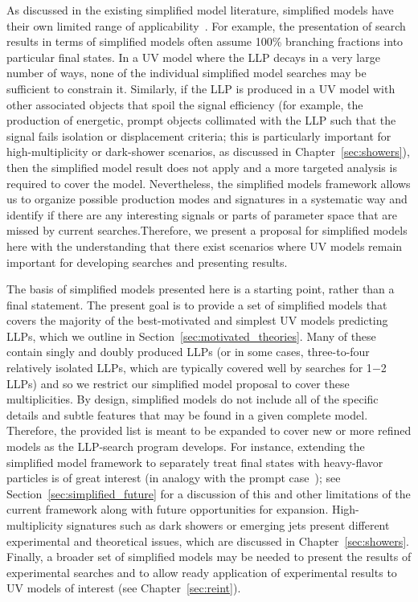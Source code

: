 As discussed in the existing simplified model literature, simplified models have their own limited range of applicability~\cite{Alves:2011wf,Abdallah:2015ter,Abercrombie:2015wmb,Boveia:2016mrp,Ambrogi:2017lov}.
For example, the presentation of search results in terms of simplified models often assume 100\% branching fractions into particular final states.
In a UV model where the LLP decays in a very large number of ways, none of the individual simplified model searches may be sufficient to constrain it.
Similarly, if the LLP is produced in a UV model with other associated objects that spoil the signal efficiency (for example, the production of energetic, prompt objects collimated with the LLP such that the signal fails isolation or displacement criteria; this is particularly important for high-multiplicity or dark-shower scenarios, as discussed in Chapter~\ref{sec:showers}), then the simplified model result does not apply and a more targeted analysis is required to cover the model.
Nevertheless, the simplified models framework allows us to organize possible production modes and signatures in a systematic way and identify if there are any interesting signals or parts of parameter space that are missed by current searches.Therefore, we present a proposal for simplified models here with the understanding that there exist scenarios where UV models remain important for developing searches and presenting results.

The basis of simplified models presented here is a starting point, rather than a final statement.
The present goal is to provide a set of simplified models that covers the majority of the best-motivated and simplest UV models predicting LLPs, which we outline in Section~\ref{sec:motivated_theories}. Many of these contain singly and doubly produced LLPs (or in some cases, three-to-four relatively isolated LLPs, which are typically covered well by searches for 1$-$2 LLPs) and so we restrict our simplified model proposal to cover these multiplicities.
By design, simplified models do not include all of the specific details and subtle features that may be found in a given complete model.
Therefore, the provided list is meant to be expanded to cover new or more refined models as the LLP-search program develops.
For instance, extending the simplified model framework to separately treat final states with heavy-flavor particles is of great interest (in analogy with the prompt case~\cite{Essig:2011qg,Brust:2011tb,Papucci:2011wy}); see Section~\ref{sec:simplified_future} for a discussion of this and other limitations of the current framework along with future opportunities for expansion.
High-multiplicity signatures such as dark showers or emerging jets present different experimental and theoretical issues, which are discussed in Chapter~\ref{sec:showers}.
Finally, a broader set of simplified models may be needed to present the results of experimental searches and to allow ready application of experimental results to UV models of interest (see Chapter~\ref{sec:reint}).

